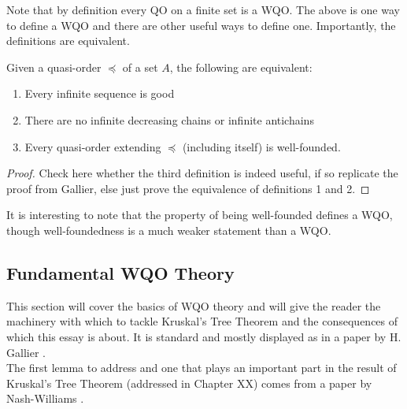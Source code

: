\documentclass[a4paper]{article}
\begin{document}
Note that by definition every QO on a finite set is a WQO. The above is one way to define a WQO and there are other useful ways to define one. Importantly, the definitions are equivalent.

\begin{lemma}
Given a quasi-order $\preccurlyeq$ of a set $A$, the following are equivalent:
	\begin{enumerate}
		\item Every infinite sequence is good
		\item There are no infinite decreasing chains or infinite antichains
		\item Every quasi-order extending $\preccurlyeq$ (including itself) is well-founded.
	\end{enumerate}
\end{lemma}
\begin{proof}
Check here whether the third definition is indeed useful, if so replicate the proof from Gallier, else just prove the equivalence of definitions 1 and 2.
\end{proof}

It is interesting to note that the property of being well-founded defines a WQO, though well-foundedness is a much weaker statement than a WQO.
\subsection{Fundamental WQO Theory}
This section will cover the basics of WQO theory and will give the reader the machinery with which to tackle Kruskal's Tree Theorem and the consequences of which this essay is about. It is standard and mostly displayed as in a paper by H. Gallier \cite{gallier}.\\

The first lemma to address and one that plays an important part in the result of Kruskal's Tree Theorem (addressed in Chapter XX) comes from a paper by Nash-Williams \cite{nash-williams_1965}.
\end{document}

